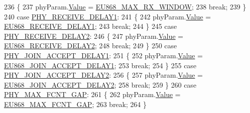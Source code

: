 \begin{DoxyCode}
236         \{
237             phyParam.\mbox{\hyperlink{unionu_phy_param_a8e0dcce3428a8051614e852b8836d0d1}{Value}} = \mbox{\hyperlink{group___r_e_g_i_o_n_e_u868_ga7d51abf9369b7478a74590db5c5c2bb1}{EU868\_MAX\_RX\_WINDOW}};
238             \textcolor{keywordflow}{break};
239         \}
240         \textcolor{keywordflow}{case} \mbox{\hyperlink{group___r_e_g_i_o_n_gga51cbe8f5433d914fe9cf81b451de2c2da3680d45f45e3e0a96ce9f1e1b5ed7371}{PHY\_RECEIVE\_DELAY1}}:
241         \{
242             phyParam.\mbox{\hyperlink{unionu_phy_param_a8e0dcce3428a8051614e852b8836d0d1}{Value}} = \mbox{\hyperlink{group___r_e_g_i_o_n_e_u868_ga5e54e03af0ee7ada0b1fd781009a24da}{EU868\_RECEIVE\_DELAY1}};
243             \textcolor{keywordflow}{break};
244         \}
245         \textcolor{keywordflow}{case} \mbox{\hyperlink{group___r_e_g_i_o_n_gga51cbe8f5433d914fe9cf81b451de2c2da9c7e3df5f55fab406960a9e5bf635155}{PHY\_RECEIVE\_DELAY2}}:
246         \{
247             phyParam.\mbox{\hyperlink{unionu_phy_param_a8e0dcce3428a8051614e852b8836d0d1}{Value}} = \mbox{\hyperlink{group___r_e_g_i_o_n_e_u868_ga5b1785ed0935234e288f90a0461cd04b}{EU868\_RECEIVE\_DELAY2}};
248             \textcolor{keywordflow}{break};
249         \}
250         \textcolor{keywordflow}{case} \mbox{\hyperlink{group___r_e_g_i_o_n_gga51cbe8f5433d914fe9cf81b451de2c2daf564c82ebd72dcd6c4fc1e702b2ec64c}{PHY\_JOIN\_ACCEPT\_DELAY1}}:
251         \{
252             phyParam.\mbox{\hyperlink{unionu_phy_param_a8e0dcce3428a8051614e852b8836d0d1}{Value}} = \mbox{\hyperlink{group___r_e_g_i_o_n_e_u868_gac37947128c2721653a6da84362c04f8c}{EU868\_JOIN\_ACCEPT\_DELAY1}};
253             \textcolor{keywordflow}{break};
254         \}
255         \textcolor{keywordflow}{case} \mbox{\hyperlink{group___r_e_g_i_o_n_gga51cbe8f5433d914fe9cf81b451de2c2da04e6c3d25ce44a74c0a29f28aa92eb48}{PHY\_JOIN\_ACCEPT\_DELAY2}}:
256         \{
257             phyParam.\mbox{\hyperlink{unionu_phy_param_a8e0dcce3428a8051614e852b8836d0d1}{Value}} = \mbox{\hyperlink{group___r_e_g_i_o_n_e_u868_ga4b26a2e21778e0a790ab45637fb8f51f}{EU868\_JOIN\_ACCEPT\_DELAY2}};
258             \textcolor{keywordflow}{break};
259         \}
260         \textcolor{keywordflow}{case} \mbox{\hyperlink{group___r_e_g_i_o_n_gga51cbe8f5433d914fe9cf81b451de2c2da01c12b14686172b4a3c4d095deef4248}{PHY\_MAX\_FCNT\_GAP}}:
261         \{
262             phyParam.\mbox{\hyperlink{unionu_phy_param_a8e0dcce3428a8051614e852b8836d0d1}{Value}} = \mbox{\hyperlink{group___r_e_g_i_o_n_e_u868_ga82b9bba1cf3046bb808448af3a3851a6}{EU868\_MAX\_FCNT\_GAP}};
263             \textcolor{keywordflow}{break};
264         \}

\end{DoxyCode}
